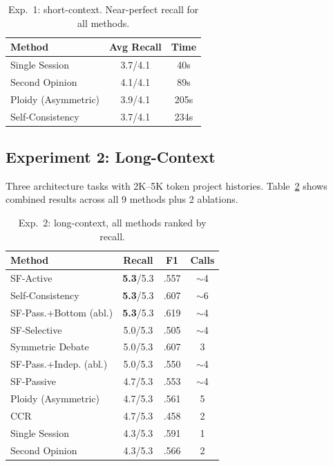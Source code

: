 \documentclass{article}
\begin{document}
\begin{table}[t]
\centering
\caption{Exp.~1: short-context. Near-perfect recall for all methods.}
\label{tab:exp1}
\footnotesize
\begin{tabular}{@{}lcc@{}}
\toprule
\textbf{Method} & \textbf{Avg Recall} & \textbf{Time} \\
\midrule
Single Session & 3.7/4.1 & 40s \\
Second Opinion & 4.1/4.1 & 89s \\
Ploidy (Asymmetric) & 3.9/4.1 & 205s \\
Self-Consistency & 3.7/4.1 & 234s \\
\bottomrule
\end{tabular}
\end{table}

\subsection{Experiment 2: Long-Context}
\label{sec:exp2}

Three architecture tasks with 2K--5K token project histories. Table~\ref{tab:exp2-main} shows combined results across all 9 methods plus 2 ablations.

\begin{table}[t]
\centering
\caption{Exp.~2: long-context, all methods ranked by recall.}
\label{tab:exp2-main}
\footnotesize
\begin{tabular}{@{}lccc@{}}
\toprule
\textbf{Method} & \textbf{Recall} & \textbf{F1} & \textbf{Calls} \\
\midrule
SF-Active & \textbf{5.3}/5.3 & .557 & $\sim$4 \\
Self-Consistency & \textbf{5.3}/5.3 & .607 & $\sim$6 \\
SF-Pass.+Bottom (abl.) & \textbf{5.3}/5.3 & .619 & $\sim$4 \\
SF-Selective & 5.0/5.3 & .505 & $\sim$4 \\
Symmetric Debate & 5.0/5.3 & .607 & 3 \\
SF-Pass.+Indep. (abl.) & 5.0/5.3 & .550 & $\sim$4 \\
SF-Passive & 4.7/5.3 & .553 & $\sim$4 \\
Ploidy (Asymmetric) & 4.7/5.3 & .561 & 5 \\
CCR & 4.7/5.3 & .458 & 2 \\
Single Session & 4.3/5.3 & .591 & 1 \\
Second Opinion & 4.3/5.3 & .566 & 2 \\
\bottomrule
\end{tabular}
\end{table}
\end{document}
